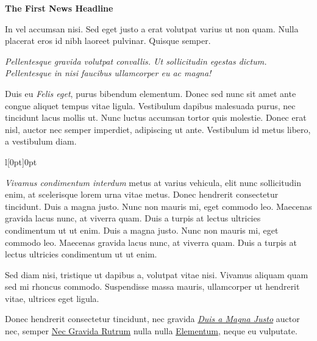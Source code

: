 \documentclass[11pt, letterpaper]{article}
\newcommand{\heading}[2]{ %
\vspace{#2} %
{\begin{center}\Large\textbf{#1}\end{center}} %
\vspace{#2} %
}
\begin{document}
\begin{minipage}[t]{.66\linewidth} %

\hypertarget{firstnews}{\heading{The First News Headline}{6pt}} %

In vel accumsan nisi. Sed eget justo a erat volutpat varius ut non quam. Nulla placerat eros id nibh laoreet pulvinar. Quisque semper.

\begin{center}
\parbox[t]{.70\linewidth}{\textsl{Pellentesque gravida volutpat convallis. Ut sollicitudin egestas dictum. Pellentesque in nisi faucibus ullamcorper eu ac magna!}}
\end{center}

Duis eu \textsl{Felis eget}, purus bibendum elementum. Donec sed nunc sit amet ante congue aliquet tempus vitae ligula. Vestibulum dapibus malesuada purus, nec tincidunt lacus mollis ut. Nunc luctus accumsan tortor quis molestie. Donec erat nisl, auctor nec semper imperdiet, adipiscing ut ante. Vestibulum id metus libero, a vestibulum diam.

\begin{wrapfigure}[7]{l}[0pt]{0pt} %
\end{wrapfigure}

\textsl{Vivamus condimentum interdum} metus at varius vehicula, elit nunc sollicitudin enim, at scelerisque lorem urna vitae metus. Donec hendrerit consectetur tincidunt. Duis a magna justo. Nunc non mauris mi, eget commodo leo. Maecenas gravida lacus nunc, at viverra quam. Duis a turpis at lectus ultricies condimentum ut ut enim. Duis a magna justo. Nunc non mauris mi, eget commodo leo. Maecenas gravida lacus nunc, at viverra quam. Duis a turpis at lectus ultricies condimentum ut ut enim.

Sed diam nisi, tristique ut dapibus a, volutpat vitae nisi. Vivamus aliquam quam sed mi rhoncus commodo. Suspendisse massa mauris, ullamcorper ut hendrerit vitae, ultrices eget ligula.

Donec hendrerit consectetur tincidunt, nec gravida \href{http://www.example.com}{\textit{Duis a Magna Justo}} auctor nec, semper \href{http://www.example.com/}{Nec Gravida Rutrum} nulla nulla \href{http://www.example.com}{Elementum}, neque eu vulputate.



\end{minipage}
\end{document}
